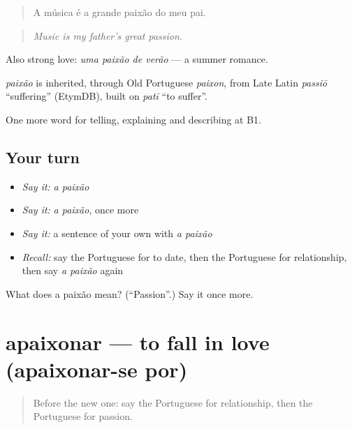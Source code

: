 \begin{quote}
A música é a grande paixão do meu pai.
\end{quote}

\begin{quote}
\emph{Music is my father's great passion.}
\end{quote}

Also strong love: \emph{uma paixão de verão} — a summer romance.

\begin{cousinweb}
\emph{paixão} is inherited, through Old Portuguese \emph{paixon}, from Late Latin \emph{passiō} \textquotedblleft{}suffering\textquotedblright{} (EtymDB), built on \emph{patī} \textquotedblleft{}to suffer\textquotedblright{}.
\end{cousinweb}

\begin{grammarlens}[title={What you've built}]
One more word for telling, explaining and describing at B1.
\end{grammarlens}

\subsection*{Your turn}
\begin{itemize}
\raggedright
  \item \emph{Say it:} \emph{a paixão}
  \item \emph{Say it:} \emph{a paixão}, once more
  \item \emph{Say it:} a sentence of your own with \emph{a paixão}
  \item \emph{Recall:} say the Portuguese for to date, then the Portuguese for relationship, then say \emph{a paixão} again
\end{itemize}

\begin{tcolorbox}[breakable,colback=teal!4,colframe=teal!35!black,title={Before you move on}]
What does a paixão mean? (\textquotedblleft{}Passion\textquotedblright{}.) Say it once more.
\end{tcolorbox}
\section[apaixonar]{apaixonar — to fall in love (apaixonar-se por)}

\label{lesson:PT-C491-apaixonar}



\begin{quote}
Before the new one: say the Portuguese for relationship, then the Portuguese for passion.
\end{quote}

